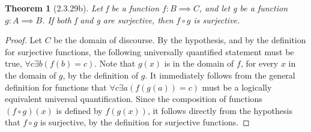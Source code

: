 \documentclass[a4paper, 12pt]{article}
\theoremstyle{plain}
\newtheorem*{theorem*}{Theorem}
\begin{document}
	
	\begin{theorem*}[2.3.29b]
		Let f be a function $f: B \implies C$, and let g be a function $g: A \implies B$. If both f and g are surjective, then $f \circ g$ is surjective.
	\end{theorem*}
	
	\begin{proof}
		Let $C$ be the domain of discourse. By the hypothesis, and by the definition for surjective functions, the following universally quantified \newline statement must be true, $\forall c \exists b (f(b) = c)$. Note that $g(x)$ is in the domain of $f$, for every $x$ in the domain of $g$, by the definition of $g$. It immediately follows from the general definition for functions that $\forall c \exists a (f(g(a)) = c)$ must be a logically equivalent universal quantification. Since the composition of \newline functions $(f \circ g)(x)$ is defined by $f(g(x))$, it follows directly from the \newline hypothesis that $f \circ g$ is surjective, by the definition for surjective functions.  
	\end{proof}
\end{document}
